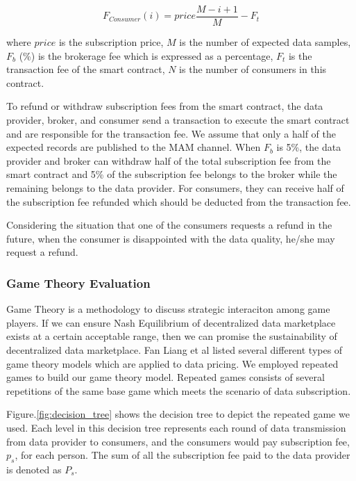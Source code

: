 \documentclass[journal,article,submit,moreauthors,pdftex]{Definitions/mdpi}
\begin{document}
\begin{equation}
    F_{Consumer}(i) = price \frac{M-i+1}{M} -F_{t}
\end{equation}

where $price$  is the subscription price, $M$ is the number of expected data samples, $F_{b}$ (\%) is the brokerage fee which is expressed as a percentage, $F_{t}$ is the transaction fee of the smart contract, $N$ is the number of consumers in this contract.

To refund or withdraw subscription fees from the smart contract, the data provider, broker, and consumer send a transaction to execute the smart contract and are responsible for the transaction fee. We assume that only a half of the expected records are published to the MAM channel. When $F_{b}$ is 5\%, the data provider and broker can withdraw half of the total subscription fee from the smart contract and 5\% of the subscription fee belongs to the broker while the remaining belongs to the data provider. For consumers, they can receive half of the subscription fee refunded which should be deducted from the transaction fee.

Considering the situation that one of the consumers requests a refund in the future, when the consumer is disappointed with the data quality, he/she may request a refund.

\subsubsection{Game Theory Evaluation}
Game Theory is a methodology to discuss strategic interaciton among game players. If we can ensure Nash Equilibrium of decentralized data marketplace exists at a certain acceptable range, then we can promise the sustainability of decentralized data marketplace. Fan Liang et al\cite{SurveyBigDataPricing} listed several different types of game theory models which are applied to data pricing. We employed repeated games to build our game theory model. Repeated games consists of several repetitions of the same base game which meets the scenario of data subscription.

Figure.\ref{fig:decision_tree} shows the decision tree to depict the repeated game we used. Each level in this decision tree represents each round of data transmission from data provider to consumers, and the consumers would pay subscription fee, $p_s$, for each person. The sum of all the subscription fee paid to the data provider is denoted as $P_s$.
\end{document}

